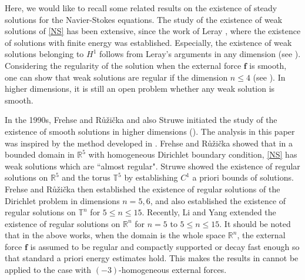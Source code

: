 \documentclass[12pt]{amsart}
\newcommand{\Bf}{{\boldsymbol{f}}}
\begin{document}
	
	
	
	
	
	
	
	Here, we would like to recall some related results on the existence of steady solutions for the Navier-Stokes equations. The study of the existence of weak solutions of \eqref{NS} has been extensive, since the work of Leray \cite{leray1933etude}, where the existence of solutions with finite energy was established. 
	Especially, the existence of weak solutions belonging to $H^1$ %
	follows from Leray's arguments in any dimension (see \cite[Chapter 2]{Tsai18}).
	Considering the regularity of the solution when the external force $\Bf$ is smooth, one can show that weak solutions are regular if the dimension $n\leq 4$ (see \cite{Gerhardt79}).
	In higher dimensions, it is still an open problem whether any weak solution is smooth.
	
	In the 1990s,  Frehse and R{\r u}\v{z}i\v{c}ka 
	and also  Struwe
	initiated the study of the existence of smooth solutions in higher dimensions (\hspace{1sp}\cite{FrehseRuzicka94,FrehseRuzicka96,Frehse94,Struwe95}). The analysis in this paper was inspired by the method developed in \cite{Frehse94,Struwe95}. 
	Frehse and R{\r u}\v{z}i\v{c}ka \cite{Frehse94} showed that in a bounded domain in $\mathbb{R}^5$ with homogeneous Dirichlet boundary condition,  \eqref{NS} has weak solutions which are ``almost regular". Struwe \cite{Struwe95}  showed the existence of regular solutions on $\mathbb{R}^5$ and the torus $\mathbb{T}^5$ by establishing  $C^1$ a priori bounds of solutions. Frehse and R{\r u}\v{z}i\v{c}ka \cite{FrehseRuzicka94, FrehseRuzicka96} then established the existence of regular solutions of the Dirichlet problem in dimensions $n = 5,6$, and also established the existence of regular solutions on $\mathbb{T}^n$ for $5 \leq n \leq 15$. Recently, Li and Yang \cite{LiYang22} extended the existence of regular solutions on $\mathbb{R}^n$ for $n=5$ to $5 \leq n \leq 15$.
	It should be noted that in the above works, when the domain is the whole space $\mathbb{R}^n$, the external force $\Bf$  is assumed to be  regular and compactly supported or  decay fast enough so that standard a priori energy estimates hold. This makes the results in \cite{Struwe95, LiYang22} cannot be applied to the case with $(-3)$-homogeneous external forces.  
	
\end{document}
